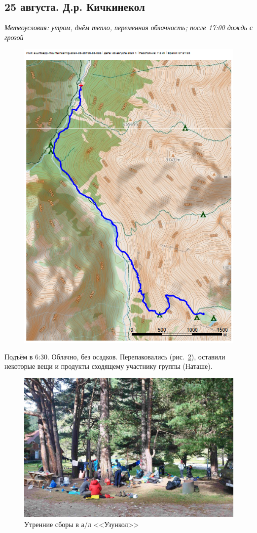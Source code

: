 \subsection{25 августа. Д.р. Кичкинекол}
\textit{Метеоусловия: утром, днём тепло, переменная облачность; после 17:00 дождь с грозой}

\begin{figure}[h!]
	\centering
	\includegraphics[angle=0, width=0.7\linewidth]{../pics/mini_maps/25}
	\label{fig:mini_25}
\end{figure}

Подъём в 6:30. Облачно, без осадков. Перепаковались (рис.~\ref{fig:DSC_0126.JPG}), оставили некоторые вещи и продукты сходящему участнику группы (Наташе). 

\begin{figure}[h!]
	\centering
	\includegraphics[width=0.7\linewidth]{../pics/DSC_0126.JPG}
	\caption{Утренние сборы в а/л <<Узункол>>}
	\label{fig:DSC_0126.JPG}
\end{figure}

